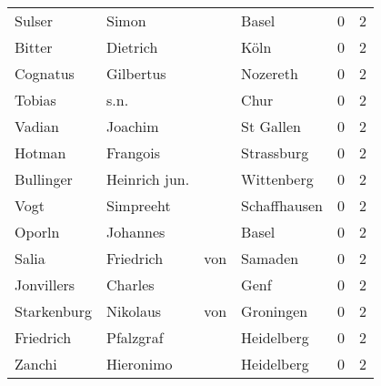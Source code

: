\begin{center}
\begin{tiny}
\begin{longtabu}{llllrr}
                   Sulser &                              Simon &             &                                       Basel &          0 &         2 \\
                   Bitter &                           Dietrich &             &                                        Köln &          0 &         2 \\
                 Cognatus &                          Gilbertus &             &                                    Nozereth &          0 &         2 \\
                   Tobias &                               s.n. &             &                                        Chur &          0 &         2 \\
                   Vadian &                            Joachim &             &                                   St Gallen &          0 &         2 \\
                   Hotman &                           Frangois &             &                                  Strassburg &          0 &         2 \\
                Bullinger &                      Heinrich jun. &             &                                  Wittenberg &          0 &         2 \\
                     Vogt &                          Simpreeht &             &                                Schaffhausen &          0 &         2 \\
                   Oporln &                           Johannes &             &                                       Basel &          0 &         2 \\
                    Salia &                          Friedrich &         von &                                     Samaden &          0 &         2 \\
               Jonvillers &                            Charles &             &                                        Genf &          0 &         2 \\
              Starkenburg &                           Nikolaus &         von &                                   Groningen &          0 &         2 \\
                Friedrich &                          Pfalzgraf &             &                                  Heidelberg &          0 &         2 \\
                   Zanchi &                          Hieronimo &             &                                  Heidelberg &          0 &         2 \\

\end{longtabu}
\end{tiny}
\end{center}
